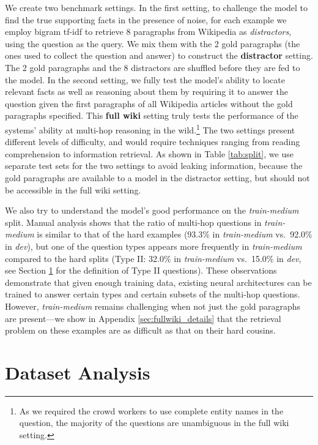 We create two benchmark settings. In the first setting, to challenge the model to find the true supporting facts in the presence of noise, for each example we employ bigram tf-idf \cite{chen2017reading} to retrieve 8 paragraphs from Wikipedia as \textit{distractors}, using the question as the query. We mix them with the 2 gold paragraphs (the ones used to collect the question and answer) to construct the \textbf{distractor} setting. The 2 gold paragraphs and the 8 distractors are shuffled before they are fed to the model. In the second setting, we fully test the model's ability to locate relevant facts as well as reasoning about them by requiring it to answer the question given the first paragraphs of all Wikipedia articles without the gold paragraphs specified. This \textbf{full wiki} setting truly tests the performance of the systems' ability at multi-hop reasoning in the wild.\footnote{As we required the crowd workers to use complete entity names in the question, the majority of the questions are unambiguous in the full wiki setting.} The two settings present different levels of difficulty, and would require techniques ranging from reading comprehension to information retrieval. As shown in Table \ref{tab:split}, we use separate test sets for the two settings to avoid leaking information, because the gold paragraphs are available to a model in the distractor setting, but should not be accessible in the full wiki setting.

We also try to understand the model's good performance on the \textit{train-medium} split. Manual analysis shows that the ratio of multi-hop questions in \textit{train-medium} is similar to that of the hard examples (93.3\% in \textit{train-medium} vs.\ 92.0\% in \textit{dev}), but one of the question types appears more frequently in \textit{train-medium} compared to the hard splits (Type II: 32.0\% in \textit{train-medium} vs.\ 15.0\% in \textit{dev}, see Section \ref{sec:analysis} for the definition of Type II questions). These observations demonstrate that given enough training data, existing neural architectures can be trained to answer certain types and certain subsets of the multi-hop questions. However, \textit{train-medium} remains challenging when not just the gold paragraphs are present---we show in Appendix \ref{sec:fullwiki_details} that the retrieval problem on these examples are as difficult as that on their hard cousins.

\section{Dataset Analysis} \label{sec:analysis}

